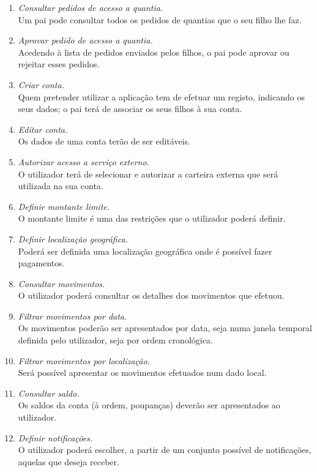 \documentclass[12pt,a4paper]{article}
\begin{document}
    \begin{enumerate}
      \item \emph{Consultar pedidos de acesso a quantia.}\\
Um pai pode consultar todos os pedidos de quantias que o seu filho lhe faz.
      \item \emph{Aprovar pedido de acesso a quantia.}\\
Acedendo à lista de pedidos enviados pelos filhos, o pai pode aprovar ou rejeitar esses pedidos.
      \item \emph{Criar conta.}\\
Quem pretender utilizar a aplicação tem de efetuar um registo, indicando os seus dados; o pai terá de associar os seus filhos à sua conta.
      \item \emph{Editar conta.} \\
Os dados de uma conta terão de ser editáveis.
      \item \emph{Autorizar acesso a serviço externo.}\\
O utilizador terá de selecionar e autorizar a carteira externa que será utilizada na sua conta.
      \item \emph{Definir montante limite.}\\
O montante limite é uma das restrições que o utilizador poderá definir.
      \item \emph{Definir localização geográfica.}\\
Poderá ser definida uma localização geográfica onde é possível fazer pagamentos.
      \item \emph{Consultar movimentos.}\\
O utilizador poderá consultar os detalhes dos movimentos que efetuou.
      \item \emph{Filtrar movimentos por data.}\\
Os movimentos poderão ser apresentados por data, seja numa janela temporal definida pelo utilizador, seja por ordem cronológica.
      \item \emph{Filtrar movimentos por localização.}\\
Será possível apresentar os movimentos efetuados num dado local.
      \item \emph{Consultar saldo.}\\
Os saldos da conta (à ordem, poupanças) deverão ser apresentados ao utilizador.
      \item \emph{Definir notificações.}\\
O utilizador poderá escolher, a partir de um conjunto possível de notificações, aquelas que deseja receber.

\end{enumerate}
\end{document}
